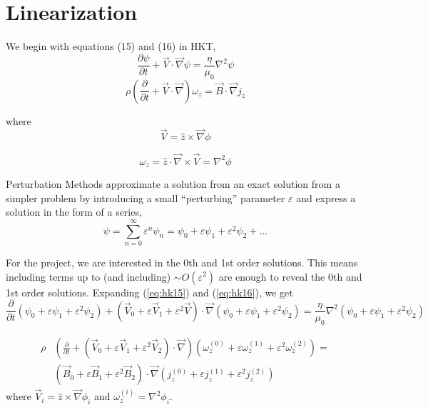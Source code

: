 \documentclass{article}
\begin{document}
\section{Linearization}
We begin with equations (15) and (16) in HKT,
\begin{equation}
    \label{eq:hk15}
    \frac{\partial \psi}{\partial t} + \vec{V}\cdot \vec{\nabla} \psi= \frac{\eta}{\mu_0} \nabla ^2 \psi
\end{equation} 
\begin{equation}
    \label{eq:hk16}
    \rho\left( \frac{\partial }{\partial t} + \vec{V}\cdot \vec{\nabla} \right)\omega_z = \vec{B}\cdot \vec{\nabla}j_z
\end{equation} 

where
\begin{equation}
    \vec{V}= \hat{z}\times \vec{\nabla}\phi
\end{equation} 

\begin{equation}
    \omega_z = \hat{z}\cdot \vec{\nabla}\times \vec{V}=\nabla ^{2}\phi
\end{equation} 

Perturbation Methods approximate a solution from an exact solution from a simpler problem by introducing a small
``perturbing'' parameter $\varepsilon$ and express a solution in the form of a series,
\begin{equation}
    \psi=\sum_{n=0}^{\infty} \varepsilon^{n}\psi_n=\psi_0+\varepsilon\psi_1+\varepsilon^{2}\psi_2+\ldots
\end{equation} 

For the project, we are interested in the 0th and 1st order solutions. This means including terms up to (and including) $\sim O(\varepsilon^2)$ are
enough to reveal the 0th and 1st order solutions. Expanding (\ref{eq:hk15}) and (\ref{eq:hk16}), we get
\begin{equation}
    \frac{\partial}{\partial t} \left(\psi_0+\varepsilon\psi_1+\varepsilon^{2}\psi_2 \right) + \left( \vec{V}_0 + \varepsilon \vec{V}_1 + \varepsilon^2 \vec{V} \right) \cdot \vec{\nabla} \left(\psi_0+\varepsilon\psi_1+\varepsilon^{2}\psi_2 \right) = \frac{\eta}{\mu_0}\nabla ^{2} \left( \psi_0+\varepsilon\psi_1+\varepsilon^{2}\psi_2 \right) 
\end{equation} 

\begin{equation}
    \begin{split}
        \rho&\left( \frac{\partial }{\partial t} + \left( \vec{V}_0 + \varepsilon \vec{V}_1 + \varepsilon^2 \vec{V}_2 \right) \cdot \vec{\nabla} \right) \left(\omega_z^{(0)} + \varepsilon \omega_z^{(1)} + \varepsilon ^{2} \omega_z^{(2)} \right) =\\
        &\left( \vec{B}_0 + \varepsilon \vec{B}_1 + \varepsilon^2 \vec{B}_2 \right) \cdot \vec{\nabla}\left(j_z^{(0)} + \varepsilon j_z^{(1)} + \varepsilon^2 j_z^{(2)}  \right) 
    \end{split}
\end{equation} 
where $\vec{V}_i = \hat{z}\times \vec{\nabla} \phi_i$ and $\omega_z^{(i)}=\nabla ^{2}\phi_i.$
\end{document}
